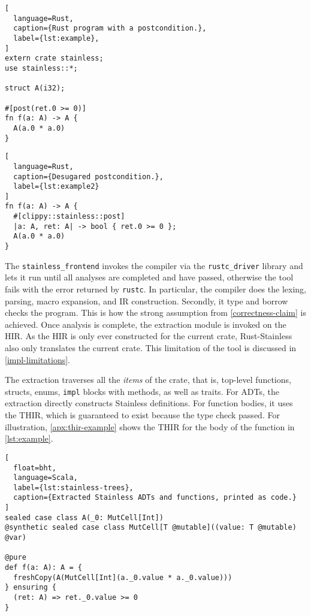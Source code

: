 \noindent\begin{minipage}[b]{.43\textwidth}
\begin{lstlisting}[
  language=Rust,
  caption={Rust program with a postcondition.},
  label={lst:example},
]
extern crate stainless;
use stainless::*;

struct A(i32);

#[post(ret.0 >= 0)]
fn f(a: A) -> A {
  A(a.0 * a.0)
}
\end{lstlisting}
\end{minipage}\hfill
\begin{minipage}[b]{.54\textwidth}
\begin{lstlisting}[
  language=Rust,
  caption={Desugared postcondition.},
  label={lst:example2}
]
fn f(a: A) -> A {
  #[clippy::stainless::post]
  |a: A, ret: A| -> bool { ret.0 >= 0 };
  A(a.0 * a.0)
}
\end{lstlisting}
\end{minipage}

The \lstinline!stainless_frontend! invokes the compiler via the
\lstinline!rustc_driver! library and lets it run until all analyses are
completed and have passed, otherwise the tool fails with the error returned by
\lstinline!rustc!. In particular, the compiler does the lexing, parsing, macro
expansion, and IR construction. Secondly, it type and borrow checks the program.
This is how the strong assumption from \autoref{correctness-claim} is achieved.
Once analysis is complete, the extraction module is invoked on the HIR. As the
HIR is only ever constructed for the current crate, Rust-Stainless also only
translates the current crate. This limitation of the tool is discussed in
\autoref{impl-limitations}.

The extraction traverses all the \emph{items} of the crate, that is, top-level
functions, structs, enums, \lstinline!impl! blocks with methods, as well as
traits. For ADTs, the extraction directly constructs Stainless definitions. For
function bodies, it uses the THIR, which is guaranteed to exist because the type
check passed. For illustration, \autoref{apx:thir-example} shows the THIR for
the body of the function in \autoref{lst:example}.

\begin{lstlisting}[
  float=bht,
  language=Scala,
  label={lst:stainless-trees},
  caption={Extracted Stainless ADTs and functions, printed as code.}
]
sealed case class A(_0: MutCell[Int])
@synthetic sealed case class MutCell[T @mutable]((value: T @mutable) @var)

@pure
def f(a: A): A = {
  freshCopy(A(MutCell[Int](a._0.value * a._0.value)))
} ensuring {
  (ret: A) => ret._0.value >= 0
}
\end{lstlisting}

